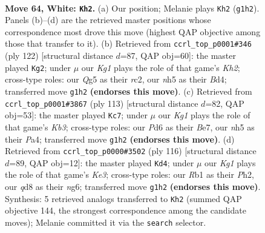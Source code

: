 \documentclass[11pt]{article}
\begin{document}
\clearpage

\begin{figure}[p]\centering
\begin{subfigure}{0.46\textwidth}\centering
\resizebox{\linewidth}{!}{%
\newchessgame
\chessboard[
  setfen={3q1k2/5p2/b2P1n2/6Qn/2p4P/p1B2pP1/P7/1R4K1 w - - 8 64},
  showmover=false,
  pgfstyle=straightmove, color=movearrow, markmove={g1-h2}
]}
\caption{}
\end{subfigure}\hfill
\begin{subfigure}{0.46\textwidth}\centering
\resizebox{\linewidth}{!}{%
\newchessgame
\chessboard[
  setfen={5n2/1R1n1k2/3p1p2/p2P1P2/P1qBP2P/4Q3/2r2N1K/8 w - - 11 62},
  showmover=false,
  pgfstyle=straightmove, color=movearrow, markmove={h2-g2}
]}
\caption{}
\end{subfigure}
\\[4pt]
\begin{subfigure}{0.46\textwidth}\centering
\resizebox{\linewidth}{!}{%
\newchessgame
\chessboard[
  setfen={8/4b3/1kn5/4p3/p1Q1N3/1pP2P2/1P6/3K1Nq1 b - - 13 57},
  showmover=false,
  pgfstyle=straightmove, color=movearrow, markmove={b6-c7}
]}
\caption{}
\end{subfigure}\hfill
\begin{subfigure}{0.46\textwidth}\centering
\resizebox{\linewidth}{!}{%
\newchessgame
\chessboard[
  setfen={4qk2/p4p2/1p4np/8/P1B2PQ1/1P2K3/7P/8 w - - 47 59},
  showmover=false,
  pgfstyle=straightmove, color=movearrow, markmove={e3-d4}
]}
\caption{}
\end{subfigure}
\caption{\textbf{Move 64, White: \texttt{Kh2}.} (a) Our position; Melanie plays \texttt{Kh2} (\texttt{g1h2}). Panels (b)--(d) are the retrieved master positions whose correspondence most drove this move (highest QAP objective among those that transfer to it). (b) Retrieved from \texttt{ccrl\_top\_p0001\#346} (ply 122) [structural distance $d$=87, QAP obj=60]: the master played \texttt{Kg2}; under $\mu$ our \emph{Kg1} plays the role of that game's \emph{Kh2}; cross-type roles: our \emph{Q}g5 as their \emph{r}c2, our \emph{n}h5 as their \emph{B}d4; transferred move \texttt{g1h2} \textbf{(endorses this move)}. (c) Retrieved from \texttt{ccrl\_top\_p0001\#3867} (ply 113) [structural distance $d$=82, QAP obj=53]: the master played \texttt{Kc7}; under $\mu$ our \emph{Kg1} plays the role of that game's \emph{Kb3}; cross-type roles: our \emph{P}d6 as their \emph{B}e7, our \emph{n}h5 as their \emph{P}a4; transferred move \texttt{g1h2} \textbf{(endorses this move)}. (d) Retrieved from \texttt{ccrl\_top\_p0000\#3502} (ply 116) [structural distance $d$=89, QAP obj=12]: the master played \texttt{Kd4}; under $\mu$ our \emph{Kg1} plays the role of that game's \emph{Ke3}; cross-type roles: our \emph{R}b1 as their \emph{P}h2, our \emph{q}d8 as their \emph{n}g6; transferred move \texttt{g1h2} \textbf{(endorses this move)}. Synthesis: 5 retrieved analogs transferred to \texttt{Kh2} (summed QAP objective 144, the strongest correspondence among the candidate moves); Melanie committed it via the \texttt{search} selector.}
\label{fig:thought-m126}
\end{figure}
\end{document}
